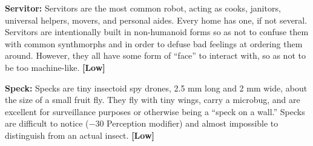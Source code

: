 \textbf{Servitor:} Servitors are the most common robot, acting as cooks, janitors, universal helpers, movers, and personal aides. Every home has one, if not several. Servitors are intentionally built in non-humanoid forms so as not to confuse them with common synthmorphs and in order to defuse bad feelings at ordering them around. However, they all have some form of ``face'' to interact with, so as not to be too machine-like. \textbf{[Low]} 

\textbf{Speck:} Specks are tiny insectoid spy drones, 2.5 mm long and 2 mm wide, about the size of a small fruit fly. They fly with tiny wings, carry a microbug, and are excellent for surveillance purposes or otherwise being a ``speck on a wall.'' Specks are difficult to notice ($-$30 Perception modifier) and almost impossible to distinguish from an actual insect. \textbf{[Low]} 

